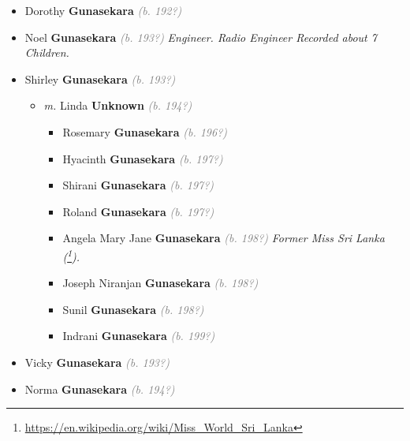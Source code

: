 \documentclass[10pt, openany]{book}
\begin{document}
\begin{itemize}
{\begin{itemize}
{\begin{itemize}
{\begin{itemize}
{ }
\item{Dorothy \textbf{Gunasekara} \textcolor{gray}{\textit{(b. 192?)}}
 }
\item{Noel \textbf{Gunasekara} \textcolor{gray}{\textit{(b. 193?)}} \textcolor{slmaroon}{\textit{Engineer.
Radio Engineer Recorded about 7 Children.}}
 }
\item{Shirley \textbf{Gunasekara} \textcolor{gray}{\textit{(b. 193?)}}
\begin{itemize}
\item{\textit{m.} Linda \textbf{Unknown} \textcolor{gray}{\textit{(b. 194?)}}   \label{couple:00000225:00000889} \begin{itemize}
\item{Rosemary \textbf{Gunasekara} \textcolor{gray}{\textit{(b. 196?)}}
 }
\item{Hyacinth \textbf{Gunasekara} \textcolor{gray}{\textit{(b. 197?)}}
 }
\item{Shirani \textbf{Gunasekara} \textcolor{gray}{\textit{(b. 197?)}}
 }
\item{Roland \textbf{Gunasekara} \textcolor{gray}{\textit{(b. 197?)}}
 }
\item{Angela Mary Jane \textbf{Gunasekara} \textcolor{gray}{\textit{(b. 198?)}} \textcolor{slmaroon}{\textit{Former Miss Sri Lanka (\footnote{\url{https://en.wikipedia.org/wiki/Miss_World_Sri_Lanka}}).}}
   }
\item{Joseph Niranjan \textbf{Gunasekara} \textcolor{gray}{\textit{(b. 198?)}}
  }
\item{Sunil \textbf{Gunasekara} \textcolor{gray}{\textit{(b. 198?)}}
 }
\item{Indrani \textbf{Gunasekara} \textcolor{gray}{\textit{(b. 199?)}}
 }
\end{itemize}}
\end{itemize}
 }
\item{Vicky \textbf{Gunasekara} \textcolor{gray}{\textit{(b. 193?)}}
 }
\item{Norma \textbf{Gunasekara} \textcolor{gray}{\textit{(b. 194?)}}
 }
\end{itemize}}

\end{itemize}}
\end{itemize}}
\end{itemize}
\end{document}
